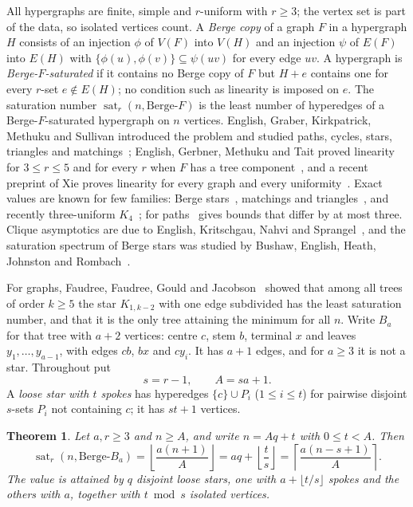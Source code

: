 \documentclass[11pt]{article}
\newtheorem{theorem}{Theorem}
\theoremstyle{definition}
\theoremstyle{remark}
\newcommand{\sat}{\operatorname{sat}}
\newcommand{\BB}{\text{Berge-}B_a}
\begin{document}
All hypergraphs are finite, simple and $r$-uniform with $r\ge3$; the vertex
set is part of the data, so isolated vertices count. A \emph{Berge copy} of
a graph $F$ in a hypergraph $H$ consists of an injection $\phi$ of $V(F)$
into $V(H)$ and an injection $\psi$ of $E(F)$ into $E(H)$ with
$\{\phi(u),\phi(v)\}\subseteq\psi(uv)$ for every edge $uv$. A hypergraph is
\emph{Berge-$F$-saturated} if it contains no Berge copy of $F$ but $H+e$
contains one for every $r$-set $e\notin E(H)$; no condition such as
linearity is imposed on $e$. The saturation number $\sat_r(n,\text{Berge-}F)$
is the least number of hyperedges of a Berge-$F$-saturated hypergraph on $n$
vertices. English, Graber, Kirkpatrick, Methuku and Sullivan introduced the
problem and studied paths, cycles, stars, triangles and
matchings~\cite{EGKMS,EGKMS-J}; English, Gerbner, Methuku and Tait proved
linearity for $3\le r\le5$ and for every $r$ when $F$ has a tree
component~\cite{EGMT}, and a recent preprint of Xie proves linearity for
every graph and every uniformity~\cite{Xie}. Exact values are known for few
families: Berge stars~\cite{AE,EGKMS}, matchings and
triangles~\cite{EGKMS}, and recently three-uniform $K_4$~\cite{CHX,CLW};
for paths~\cite{EGKMS} gives bounds that differ by at most three. Clique asymptotics are due to English, Kritschgau,
Nahvi and Sprangel~\cite{EKNS}, and the saturation spectrum of Berge stars
was studied by Bushaw, English, Heath, Johnston and Rombach~\cite{BEHJR}.

For graphs, Faudree, Faudree, Gould and Jacobson~\cite{FFGJ} showed that
among all trees of order $k\ge5$ the star $K_{1,k-2}$ with one edge
subdivided has the least saturation number, and that it is the only tree
attaining the minimum for all $n$. Write $B_a$ for that tree with $a+2$
vertices: centre $c$, stem $b$, terminal $x$ and leaves $y_1,\dots,y_{a-1}$,
with edges $cb$, $bx$ and $cy_i$. It has $a+1$ edges, and for $a\ge3$ it is
not a star. Throughout put
\[
s=r-1,\qquad A=sa+1 .
\]
A \emph{loose star with $t$ spokes} has hyperedges $\{c\}\cup P_i$
($1\le i\le t$) for pairwise disjoint $s$-sets $P_i$ not containing $c$; it
has $st+1$ vertices.

\begin{theorem}\label{thm:main}
Let $a,r\ge3$ and $n\ge A$, and write $n=Aq+t$ with $0\le t<A$. Then
\[
\sat_r(n,\BB)=\left\lfloor\frac{a(n+1)}{A}\right\rfloor
=aq+\left\lfloor\frac ts\right\rfloor
=\left\lceil\frac{a(n-s+1)}{A}\right\rceil .
\]
The value is attained by $q$ disjoint loose stars, one with
$a+\lfloor t/s\rfloor$ spokes and the others with $a$, together with
$t\bmod s$ isolated vertices.
\end{theorem}
\end{document}
